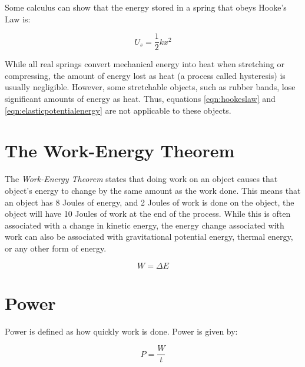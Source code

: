 	Some calculus can show that the energy stored in a spring that obeys Hooke's Law is: 
	
	\begin{mdframed}[backgroundcolor=orange!20!white]
		\begin{equation}
		U_s = \frac{1}{2}kx^2
		\label{eqn:elasticpotentialenergy}
		\end{equation}
	\end{mdframed}

	While all real springs convert mechanical energy into heat when stretching or compressing, the amount of energy lost as heat (a process called hysteresis) is usually negligible.  However, some stretchable objects, such as rubber bands, lose significant amounts of energy as heat.  Thus, equations \ref{eqn:hookeslaw} and \ref{eqn:elasticpotentialenergy} are not applicable to these objects.  
	

	
	\section{The Work-Energy Theorem}
	The \textit{Work-Energy Theorem} states that doing work on an object causes that object's energy to change by the same amount as the work done.  This means that an object has 8 Joules of energy, and 2 Joules of work is done on the object, the object will have 10 Joules of work at the end of the process.  	While this is often associated with a change in kinetic energy, the energy change associated with work can also be associated with gravitational potential energy, thermal energy, or any other form of energy.  
	
		\begin{mdframed}[backgroundcolor=orange!20!white]
		\begin{equation}
			W = \Delta E
			\label{equation:workenergy}
		\end{equation}
	\end{mdframed}
	
		\section{Power}
	
	
	Power is defined as how quickly work is done.  Power is given by:
	
	\begin{mdframed}[backgroundcolor=orange!20!white]
		\begin{equation}
			P = \frac{W}{t}
			\label{equation:power}
		\end{equation}
	\end{mdframed}
	
